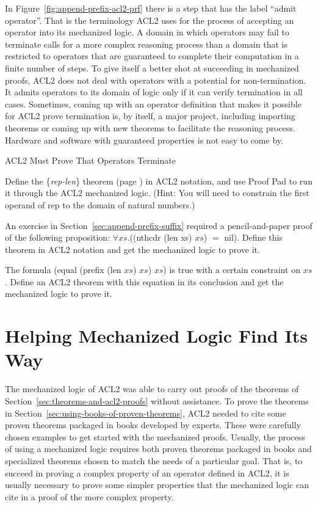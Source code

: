 \begin{aside}
In Figure~\ref{fig:append-prefix-acl2-prf}
there is a step that has the label ``admit operator''.
That is the terminology ACL2 uses for the process of accepting
an operator into its mechanized logic.
A domain in which operators may fail to terminate
calls for a more complex reasoning process than a domain that is
restricted to operators that are guaranteed to complete their
computation in a finite number of steps.
To give itself a better shot at succeeding in mechanized proofs,
ACL2 does not deal with operators with a potential for non-termination.
It admits operators to its domain of logic
only if it can verify termination in all cases.
Sometimes, coming up with an operator definition that makes
it possible for ACL2 prove termination is, by itself,
a major project, including importing theorems or coming up with new
theorems to facilitate the reasoning process.
Hardware and software with guaranteed properties is not easy to come by.
\caption{ACL2 Must Prove That Operators Terminate}
\label{reason-for-acl2-admit}
\end{aside}

\begin{ExerciseList}

\Exercise Define the \{\emph{rep-len}\} theorem (page \pageref{rep-len}) in ACL2 notation,
and use Proof Pad to run it through the ACL2 mechanized logic.
(Hint: You will need to constrain the first operand of rep to the domain of natural numbers.)

\Exercise An exercise in Section~\ref{sec:append-prefix-suffix} required a pencil-and-paper
proof of the following proposition: $\forall xs.$((nthcdr (len xs) $xs$) $=$ nil).
Define this theorem in ACL2 notation and get the mechanized logic to prove it.

\Exercise The formula (equal (prefix (len $xs$) $xs$) $xs$) is true with a certain
constraint on $xs$. Define an ACL2 theorem with this equation in its conclusion
and get the mechanized logic to prove it.

\end{ExerciseList}

\section{Helping Mechanized Logic Find Its Way}
\label{sec:lemmas}

The mechanized logic of ACL2 was able to carry out proofs of
the theorems of Section~\ref{sec:theorems-and-acl2-proofs} without assistance.
To prove the theorems in Section~\ref{sec:using-books-of-proven-theorems},
ACL2 needed to cite some proven theorems packaged in books
developed by experts.
These were carefully chosen examples to get started with
the mechanized proofs.
Usually, the process of using a mechanized logic requires
both proven theorems packaged in books
and specialized theorems chosen to match the
needs of a particular goal.
That is, to succeed in proving a complex property of
an operator defined in ACL2,
it is usually necessary to prove
some simpler properties that the mechanized
logic can cite in a proof of the more complex property.

